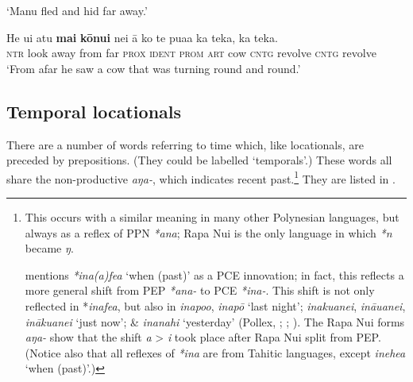 \glt 
‘Manu fled and hid far away.’ \textstyleExampleref{[R459.007]} 
\z

\ea\label{ex:3.172}
\gll He u{\ꞌ}i atu \textbf{mai} \textbf{kōnui} nei {\ꞌ}ā ko te pua{\ꞌ}a ka teka, ka teka. \\
\textsc{ntr} look away from far \textsc{prox} \textsc{ident} \textsc{prom} \textsc{art} cow \textsc{cntg} revolve \textsc{cntg} revolve \\

\glt 
‘From afar he saw a cow that was turning round and round.’ \textstyleExampleref{[R250.137]} 
\zlast


  
\subsection{Temporal locationals}\label{sec:3.6.4}
There are a number of words referring to time which, like locationals, are preceded by prepositions. (They could be labelled ‘temporals’.) These words all share the non-productive  \textit{{\ꞌ}aŋa-}, which indicates recent past.\footnote{\label{fn:155}This  occurs with a similar meaning in many other Polynesian languages, but always as a reflex of PPN \textit{*{\ꞌ}ana}; Rapa Nui is the only language in which \textit{*n} became \textit{ŋ}. 

\citet[12]{Green1985} mentions \textit{*ina(a)fea} ‘when (past)’ as a PCE innovation; in fact, this reflects a more general shift from PEP \textit{*{\ꞌ}ana-} to PCE \textit{*ina-}. This shift is not only reflected in *\textit{inafea}, but also in  \textit{inapoo},  \textit{inapō} ‘last night’;  \textit{inakuanei},  \textit{inā{\ꞌ}uanei},  \textit{inākuanei} ‘just now’;  \&  \textit{inanahi} ‘yesterday’ (Pollex, \citealt{GreenhillClark2011}; \citealt{Bauer1993}; \citealt{AcadémieTahitienne1999}). The Rapa Nui forms \textit{{\ꞌ}aŋa-} show that the shift \textit{a} {\textgreater} \textit{i} took place after Rapa Nui split from PEP. (Notice also that all reflexes of \textit{*ina} are from Tahitic languages, except  \textit{inehea} ‘when (past)’.)} They are listed in .

